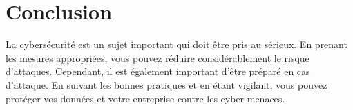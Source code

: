 \documentclass[a4paper,11pt]{article}
\begin{document}
\section{Conclusion}

La cybersécurité est un sujet important qui doit être pris au sérieux. En prenant les mesures appropriées, vous pouvez réduire considérablement le risque d’attaques. Cependant, il est également important d’être préparé en cas d’attaque. En suivant les bonnes pratiques et en étant vigilant, vous pouvez protéger vos données et votre entreprise contre les cyber-menaces.




\end{document}
